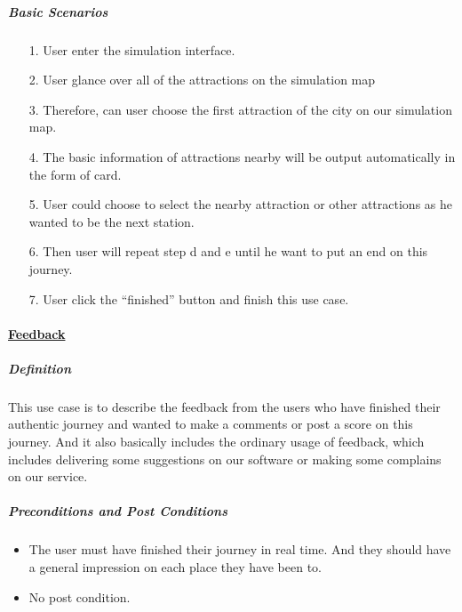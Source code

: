 \documentclass[10pt]{article}
\begin{document}
\begin{itemize}
		\subparagraph{Basic Scenarios} 
		\begin{itemize}
			\item[1.]	User enter the simulation interface.
			\item[2.]	User glance over all of the attractions on the simulation map
			\item[3.]	Therefore,  can user choose the first attraction of the city on our simulation map.
			\item[4.] The basic information of attractions nearby will be output automatically in the form of card.
			\item[5.]User could choose to select the nearby attraction or other attractions as he wanted to be the next station.
			\item[6.] Then user will repeat step d and e until he want to put an end on this journey.
			\item[7.]User click the “finished” button and finish this use case.
			
		\end{itemize}

		\paragraph{\underline{Feedback}}

		\subparagraph{Definition}
		This use case is to describe the feedback from the users who have finished their authentic journey and wanted to make a comments or post a score on this journey. And it also basically includes the ordinary usage of feedback, which includes delivering some suggestions on our software or making some complains on our service.

		\subparagraph{Preconditions and Post Conditions}
		\begin{itemize}
			\item The user must have finished their journey in real time. And they should have a general impression on each place they have been to. 
			\item No post condition.
		\end{itemize}


\end{itemize}
\end{document}
